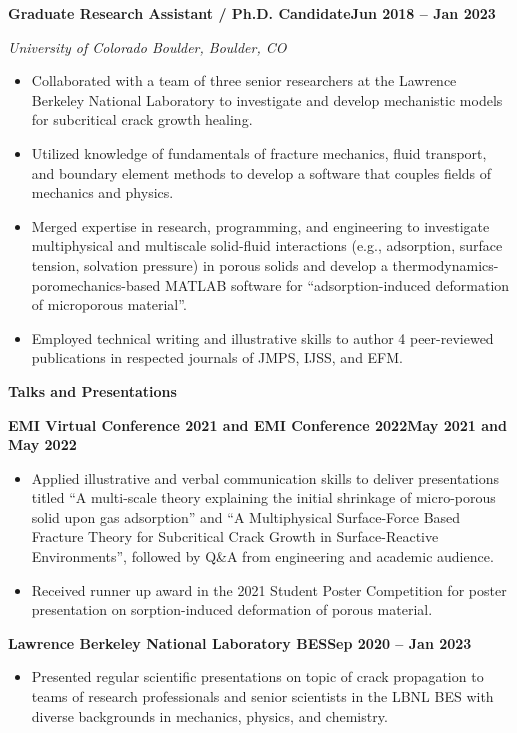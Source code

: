 \documentclass[10pt, letterpaper]{article}
\newcommand{\jobline}[2]{%
  \vspace{5pt}%
  \noindent\textbf{#1}\hfill\textbf{#2}\par%
  \vspace{1pt}%
}
\newcommand{\subline}[1]{%
  \vspace{-1pt}%
  \noindent\textit{#1}\par%
  \vspace{1pt}%
}
\newenvironment{rlist}{%
  \begin{itemize}[leftmargin=1.4em, itemsep=1pt, topsep=2pt, parsep=0pt]%
}{%
  \end{itemize}%
}
\begin{document}
\jobline{Graduate Research Assistant / Ph.D. Candidate}{Jun 2018 -- Jan 2023}
\subline{University of Colorado Boulder, Boulder, CO}
\begin{rlist}
  \item Collaborated with a team of three senior researchers at the Lawrence Berkeley National Laboratory to investigate and develop mechanistic models for subcritical crack growth healing.
  \item Utilized knowledge of fundamentals of fracture mechanics, fluid transport, and boundary element methods to develop a software that couples fields of mechanics and physics.
  \item Merged expertise in research, programming, and engineering to investigate multiphysical and multiscale solid-fluid interactions (e.g., adsorption, surface tension, solvation pressure) in porous solids and develop a thermodynamics-poromechanics-based MATLAB software for ``adsorption-induced deformation of microporous material''.
  \item Employed technical writing and illustrative skills to author 4 peer-reviewed publications in respected journals of JMPS, IJSS, and EFM.
\end{rlist}

\vspace{4pt}
\noindent\textbf{Talks and Presentations}

\jobline{EMI Virtual Conference 2021 and EMI Conference 2022}{May 2021 and May 2022}
\begin{rlist}
  \item Applied illustrative and verbal communication skills to deliver presentations titled ``A multi-scale theory explaining the initial shrinkage of micro-porous solid upon gas adsorption'' and ``A Multiphysical Surface-Force Based Fracture Theory for Subcritical Crack Growth in Surface-Reactive Environments'', followed by Q\&A from engineering and academic audience.
  \item Received runner up award in the 2021 Student Poster Competition for poster presentation on sorption-induced deformation of porous material.
\end{rlist}

\jobline{Lawrence Berkeley National Laboratory BES}{Sep 2020 -- Jan 2023}
\begin{rlist}
  \item Presented regular scientific presentations on topic of crack propagation to teams of research professionals and senior scientists in the LBNL BES with diverse backgrounds in mechanics, physics, and chemistry.
\end{rlist}
\end{document}
